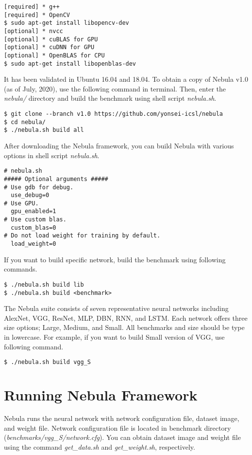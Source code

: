 \documentclass[10pt]{article}
\begin{document}
\begin{Verbatim}[frame=single,fontsize=\small]
[required] * g++
[required] * OpenCV
$ sudo apt-get install libopencv-dev
[optional] * nvcc
[optional] * cuBLAS for GPU 
[optional] * cuDNN for GPU
[optional] * OpenBLAS for CPU
$ sudo apt-get install libopenblas-dev
\end{Verbatim}

It has been validated in Ubuntu 16.04 and 18.04.
To obtain a copy of Nebula v1.0 (as of July, 2020), use the following command in terminal.
Then, enter the \emph{nebula/} directory and build the benchmark using shell script \emph{nebula.sh}.

\begin{Verbatim}[frame=single,fontsize=\small]
$ git clone --branch v1.0 https://github.com/yonsei-icsl/nebula
$ cd nebula/
$ ./nebula.sh build all
\end{Verbatim}

After downloading the Nebula framework, you can build Nebula with various options in shell script \emph{nebula.sh}.

\begin{Verbatim}[frame=single,fontsize=\small]
# nebula.sh
##### Optional arguments #####
# Use gdb for debug.
  use_debug=0
# Use GPU.
  gpu_enabled=1
# Use custom blas.
  custom_blas=0
# Do not load weight for training by default.
  load_weight=0
\end{Verbatim}
If you want to build specific network, build the benchmark using following commands.
\begin{Verbatim}[frame=single,fontsize=\small]
$ ./nebula.sh build lib
$ ./nebula.sh build <benchmark>
\end{Verbatim}
The Nebula suite consists of seven representative neural networks including AlexNet, VGG, ResNet, MLP, DBN, RNN, and LSTM.
Each network offers three size options; Large, Medium, and Small.
All benchmarks and size should be type in lowercase.
For example, if you want to build Small version of VGG, use following command.

\begin{Verbatim}[frame=single,fontsize=\small]
$ ./nebula.sh build vgg_S
\end{Verbatim}

\section{Running Nebula Framework} \label{sec:running}

Nebula runs the neural network with network configuration file, dataset image, and weight file.
Network configuration file is located in benchmark directory (\emph{benchmarks/vgg\_S/network.cfg}).
You can obtain dataset image and weight file using the command \emph{get\_data.sh} and \emph{get\_weight.sh}, respectively.
\end{document}
